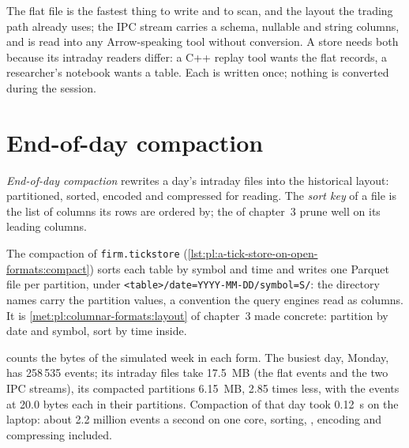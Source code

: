 \begin{remark}\label{rem:pl:a-tick-store-on-open-formats:twoforms}
The flat file is the fastest thing to write and to scan, and the layout the trading path already uses; the IPC stream carries a
schema, nullable and string columns, and is read into any Arrow-speaking tool without conversion. A store needs both because
its intraday readers differ: a C++ replay tool wants the flat records, a researcher's notebook wants a table. Each is written
once; nothing is converted during the session.
\end{remark}

\section{End-of-day compaction}

\begin{definition}\label{def:pl:a-tick-store-on-open-formats:compaction}
\emph{End-of-day compaction} rewrites a day's intraday files into the historical layout: partitioned,
sorted, encoded and compressed for reading. The \emph{sort key} of a file is the list of columns its rows are
ordered by; the  of chapter~3 prune well on its leading columns.
\end{definition}

The compaction of \texttt{firm.tickstore} (\cref{lst:pl:a-tick-store-on-open-formats:compact}) sorts each table by symbol and
time and writes one Parquet file per partition, under \texttt{<table>/date=YYYY-MM-DD/symbol=S/}: the directory names carry
the partition values, a convention the query engines read as columns. It is \cref{met:pl:columnar-formats:layout} of
chapter~3 made concrete: partition by date and symbol, sort by time inside.

\label{lst:pl:a-tick-store-on-open-formats:compact}

 counts the bytes of the simulated week in each form. The busiest day, Monday,
has 258\,535 events; its intraday files take 17.5~MB (the flat events and the two IPC streams), its compacted partitions 6.15~MB,
2.85 times less, with the events at 20.0 bytes each in their partitions. Compaction of that day took 0.12~s on the laptop:
about 2.2 million events a second on one core, sorting, , encoding and compressing included.

